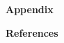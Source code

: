 \documentclass{amsart}
\theoremstyle{definition}
\begin{document}

\textbf{Appendix}











\textbf{References}

\end{document}
